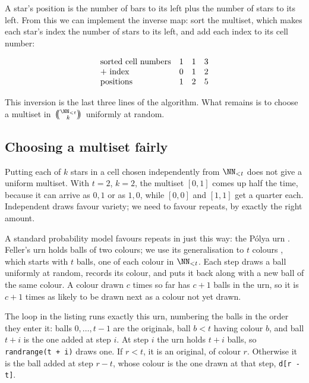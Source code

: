 \documentclass[letterpaper,11pt]{article}
\newcommand{\multichoose}[2]{
\left.\mathchoice
  {\left(\kern-0.48em\binom{#1}{#2}\kern-0.48em\right)}
  {\big(\kern-0.30em\binom{\smash{#1}}{\smash{#2}}\kern-0.30em\big)}
  {\left(\kern-0.30em\binom{\smash{#1}}{\smash{#2}}\kern-0.30em\right)}
  {\left(\kern-0.30em\binom{\smash{#1}}{\smash{#2}}\kern-0.30em\right)}
\right.}
\begin{document}
A star's position is the number of bars to its left plus the number of
stars to its left. From this we can implement the inverse map: sort
the multiset, which makes each star's index the number of stars to its
left, and add each index to its cell number:

\begin{displaymath}
    \begin{array}{ l c c c }
        \text{sorted cell numbers} & 1 & 1 & 3 \\
        \text{+ index} & 0 & 1 & 2 \\
        \text{positions} & 1 & 2 & 5 \\
    \end{array}
\end{displaymath}

This inversion is the last three lines of the algorithm. What remains
is to choose a multiset in \(\multichoose{\NN_{<t}}{k}\) uniformly at
random.

\subsection{Choosing a multiset fairly}\label{fairmultiset}

Putting each of \(k\) stars in a cell chosen independently from
\(\NN_{<t}\) does not give a uniform multiset. With \(t = 2\), \(k =
2\), the multiset \([0, 1]\) comes up half the time, because it can
arrive as \(0, 1\) or as \(1, 0\), while \([0, 0]\) and \([1, 1]\) get
a quarter each. Independent draws favour variety; we need to favour
repeats, by exactly the right amount.

A standard probability model favours repeats in just this way: the
P\'olya urn \cite[Chapter V \S 2, pp.~119--120]{feller}. Feller's urn
holds balls of two colours; we use its generalisation to \(t\) colours
\cite[\S 2.4]{levinperes}, which starts with \(t\) balls, one of each
colour in \(\NN_{<t}\). Each step draws a ball
uniformly at random, records its colour, and puts it back along with a
new ball of the same colour. A colour drawn \(c\) times so far has \(c
+ 1\) balls in the urn, so it is \(c + 1\) times as likely to be drawn
next as a colour not yet drawn.

The loop in the listing runs exactly this urn, numbering the balls in
the order they enter it: balls \(0, \ldots, t - 1\) are the originals,
ball \(b < t\) having colour \(b\), and ball \(t + i\) is the one added
at step \(i\). At step \(i\) the urn holds \(t + i\) balls, so
\texttt{randrange(t + i)} draws one. If \(r < t\), it is
an original, of colour \(r\). Otherwise it is the ball added at step
\(r - t\), whose colour is the one drawn at that step,
\texttt{d[r - t]}.
\end{document}
